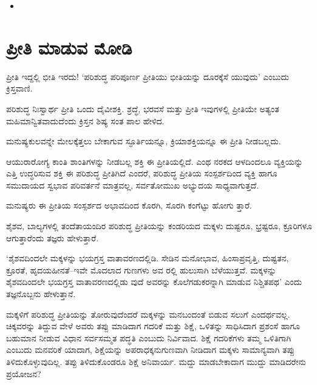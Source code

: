 \begin{itemize}
 \item {}

\end{itemize}


\section{ಪ್ರೀತಿ ಮಾಡುವ ಮೋಡಿ}

ಪ್ರೀತಿ ಇದ್ದಲ್ಲಿ ಭೀತಿ ಇರದು! ‘ಪರಿಶುದ್ಧ ಪರಿಪೂರ್ಣ ಪ್ರೀತಿಯು ಭೀತಿಯನ್ನು ದೂರಕ್ಕೆಸೆ ಯುವುದು’ ಎಂಬುದು ಕ್ರಿಸ್ತವಾಣಿ.

ಪರಿಶುದ್ಧ ನಿಃಸ್ವಾರ್ಥ ಪ್ರೀತಿ ಒಂದು ದೈವೀಶಕ್ತಿ. ಶ್ರದ್ಧೆ, ಭರವಸೆ ಮತ್ತು ಪ್ರೀತಿ ಇವುಗಳಲ್ಲಿ ಪ್ರೀತಿಯೇ ಅತ್ಯಂತ ಮಹಿಮಾನ್ವಿತವಾದುದೆಂದು ಕ್ರಿಸ್ತನ ಶಿಷ್ಯ ಸಂತ ಪಾಲ ಹೇಳಿದ.

ಮನುಷ್ಯಕುಲವನ್ನೇ ಮೇಲಕ್ಕೆತ್ತಲು ಬೇಕಾಗುವ ಸ್ಫೂರ್ತಿಯನ್ನೂ, ಕ್ರಿಯಾಶಕ್ತಿಯನ್ನೂ ಈ ಪ್ರೀತಿ ನೀಡಬಲ್ಲದು.

ಆಯುರಾರೋಗ್ಯ ಕಾಂತಿ ಶಾಂತಿಗಳನ್ನು ನೀಡಬಲ್ಲ ಶಕ್ತಿ ಈ ಪ್ರೀತಿಯಲ್ಲಿದೆ. ಎಂಥ ನರಕದ ಆಳದಿಂದಲೂ ವ್ಯಕ್ತಿಯನ್ನು ಎತ್ತಿ ಉದ್ಧರಿಸುವ ಶಕ್ತಿ ಈ ಪರಿಶುದ್ಧ ಪ್ರೀತಿಗಿದೆ ಎಂದರೆ, ಪರಿಶುದ್ಧ ಪ್ರೀತಿಯ ಸಂಸ್ಪರ್ಶದಿಂದ ವ್ಯಕ್ತಿ ಹಾಗೂ ಸಮುದಾಯದ ಸ್ವಭಾವ ಪರಿವರ್ತನೆ ಮಾತ್ರವಲ್ಲ, ಸರ್ವತೋಮುಖ ಅಭ್ಯುದಯ ಸಾಧ್ಯವಾಗುತ್ತದೆ.

ಮನುಷ್ಯರು ಈ ಪ್ರೀತಿಯ ಸಂಸ್ಪರ್ಶದ ಅಭಾವದಿಂದ ಕೊರಗಿ, ಸೊರಗಿ ಕಂಗೆಟ್ಟು ಹೋಗು ತ್ತಾರೆ.

ಶೈಶವ, ಬಾಲ್ಯಗಳಲ್ಲಿ ತಂದೆತಾಯಂದಿರ ಪರಿಶುದ್ಧ ಪ್ರೀತಿಯನ್ನು ಕಂಡರಿಯದ ಮಕ್ಕಳು ದುಷ್ಟರೂ, ಭ್ರಷ್ಟರೂ, ಕ್ರೂರಿಗಳೂ ಆಗುತ್ತಾರೆಂದು ತಜ್ಞರು ಹೇಳುತ್ತಾರೆ.

‘ಶೈಶವದಿಂದಲೇ ಮಕ್ಕಳನ್ನು ಭಯಗ್ರಸ್ತ ವಾತಾವರಣದಲ್ಲಿಡಿ. ಸೇಡಿನ ಮನೋಭಾವ, ಹಿಂಸಾಪ್ರವೃತ್ತಿ, ದುಷ್ಟತನ, ಕ್ರೂರತೆ, ಹೃದಯಹೀನತೆ–ಇವೇ ಮೊದಲಾದ ಗುಣಗಳು ಅವ ರಲ್ಲಿ ಹುಲುಸಾಗಿ ಬೆಳೆಯುತ್ತವೆ. ಮಕ್ಕಳನ್ನು ಶೈಶವದಿಂದಲೇ ಭಯಗ್ರಸ್ತ ವಾತಾವರಣದಲ್ಲಿಡು ವುದೆ ಅವರನ್ನು ಕೊಲೆಗಡುಕರನ್ನಾಗಿ ಮಾಡುವ ನಿಶ್ಚಿತಪಥ’ ಎಂದು ತಜ್ಞನೊಬ್ಬನು ಹೇಳುತ್ತಾನೆ.

ಮಕ್ಕಳಿಗೆ ಪರಿಶುದ್ಧ ಪ್ರೀತಿಯನ್ನು ತೋರುವುದೆಂದರೆ ಮಕ್ಕಳನ್ನು ಮನಬಂದಂತೆ ಬಿಡುವ ಸಲುಗೆ ಎಂದರ್ಥವಲ್ಲ. ಚಿಕ್ಕವರನ್ನು ತಿದ್ದುವ ವೇಳೆ ಅವರು ತಪ್ಪು ಮಾಡಿದಾಗ ಗದರಿಕೆ ಮತ್ತು ಶಿಕ್ಷೆ, ಒಳಿತನ್ನು ಸಾಧಿಸಿದಾಗ ಪ್ರಶಂಸೆ ಹಾಗೂ ಬಹುಮಾನ ನೀಡುವ ವಿಧಾನ ಸರ್ವಸಮ್ಮತ ಪದ್ಧತಿ ಎಂಬುದು ನಿರ್ವಿವಾದ. ಶಿಕ್ಷೆ ಗದರಿಕೆಗಳು ತಮ್ಮ ಒಳಿತಿಗಾಗಿ ಎಂಬುದು ಮನವರಿಕೆ ಯಾದಾಗ, ಶಿಕ್ಷೆಯನ್ನು ಅಪರಾಧಕ್ಕನುಗುಣವಾಗಿ ನೀಡಿದಾಗ ಮಕ್ಕಳು ಸಾಮಾನ್ಯವಾಗಿ ತಪ್ಪು ತಿಳಿದುಕೊಳ್ಳುವುದಿಲ್ಲ. ತಪ್ಪು ತಿಳಿದುಕೊಂಡರೂ ಶಿಕ್ಷೆ ಅನಿವಾರ್ಯ. ಮದ್ದು ಮಾಡಬೇಕಾದಾಗ ಮುದ್ದು ಮಾಡಿದರೇನು ಪ್ರಯೋಜನ?



